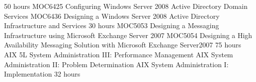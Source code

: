 \documentclass[11pt,a4paper]{moderncv}
\begin{document}
 {50 hours}{\scriptsize{
MOC6425 Configuring Windows Server 2008 Active Directory Domain Services \newline %
MOC6436 Designing a Windows Server 2008 Active Directory Infrastructure and Services}}
 {30 hours}{\scriptsize{
MOC5053 Designing a Messaging Infrastructure using Microsoft Exchange Server 2007\newline
MOC5054 Designing a High Availability Messaging Solution with Microsoft Exchange Server2007}}
 {75 hours}{\scriptsize{
AIX 5L System Administration III: Performance Management\newline
AIX System Administration II: Problem Determination\newline
AIX System Administration I: Implementation }}%
 {32 hours}{}
\end{document}
